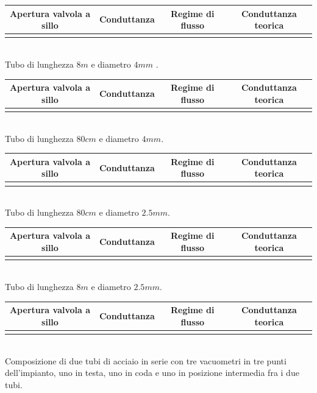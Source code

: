 \documentclass[a4paper,11pt]{article}
\begin{document}
\begin{center} 
\begin{tabular}{|c|c|c|c|}
\hline Apertura valvola a sillo & Conduttanza & Regime di flusso & Conduttanza teorica \\ 
\hline  &  &  &  \\ 
\hline 
\end{tabular}\\
Tubo di lunghezza $8m$ e diametro $4mm$ .
\\
\vspace{10pt}
\begin{tabular}{|c|c|c|c|}
\hline Apertura valvola a sillo & Conduttanza & Regime di flusso & Conduttanza teorica \\ 
\hline  &  &  &  \\ 
\hline 
\end{tabular} \\
Tubo di lunghezza $80cm$ e diametro $4mm$.
\\
\vspace{10pt}
\begin{tabular}{|c|c|c|c|}
\hline Apertura valvola a sillo & Conduttanza & Regime di flusso & Conduttanza teorica \\ 
\hline  &  &  &  \\ 
\hline 
\end{tabular} \\
Tubo di lunghezza $80cm$ e diametro $2.5mm$.
\\
\vspace{10pt}
\begin{tabular}{|c|c|c|c|}
\hline Apertura valvola a sillo & Conduttanza & Regime di flusso & Conduttanza teorica \\ 
\hline  &  &  &  \\ 
\hline 
\end{tabular}\\
Tubo di lunghezza $8m$ e diametro $2.5mm$.
\\
\vspace{10pt}
\begin{tabular}{|c|c|c|c|}
\hline Apertura valvola a sillo & Conduttanza & Regime di flusso & Conduttanza teorica \\ 
\hline  &  &  &  \\ 
\hline 
\end{tabular}\\ 
Composizione di due tubi di acciaio in serie con tre vacuometri in tre punti dell'impianto, uno in testa, uno in coda e uno in posizione intermedia fra i due tubi.
\vspace{10pt}
\end{center}
\end{document}
